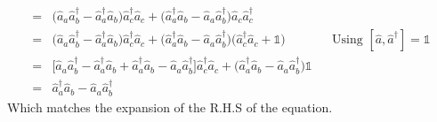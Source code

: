 \documentclass{article}
\renewcommand{\RAISE}[0]{\hat{a}^{\dagger}}
\renewcommand{\LOWER}[0]{\hat{a}}
\begin{document}
\begin{align*}
    =& \big( \LOWER_a\RAISE_b - \RAISE_a\LOWER_b \big) \RAISE_c\LOWER_c
        + \big( \RAISE_a\LOWER_b - \LOWER_a\RAISE_b \big) \LOWER_c\RAISE_c \\
    =& \big( \LOWER_a\RAISE_b - \RAISE_a\LOWER_b \big) \RAISE_c\LOWER_c
        + \big( \RAISE_a\LOWER_b - \LOWER_a\RAISE_b \big) \big( \RAISE_c\LOWER_c + \mathbb{1} \big)
        && \text{Using } [\LOWER,\RAISE] = \mathbb{1} \\
    =& \Big[ \LOWER_a\RAISE_b - \RAISE_a\LOWER_b + \RAISE_a\LOWER_b - \LOWER_a\RAISE_b \Big] \RAISE_c\LOWER_c
        + \big( \RAISE_a\LOWER_b - \LOWER_a\RAISE_b \big) \mathbb{1} \\
    =& \RAISE_a\LOWER_b - \LOWER_a\RAISE_b
\end{align*}
Which matches the expansion of the R.H.S of the equation.
\end{document}
